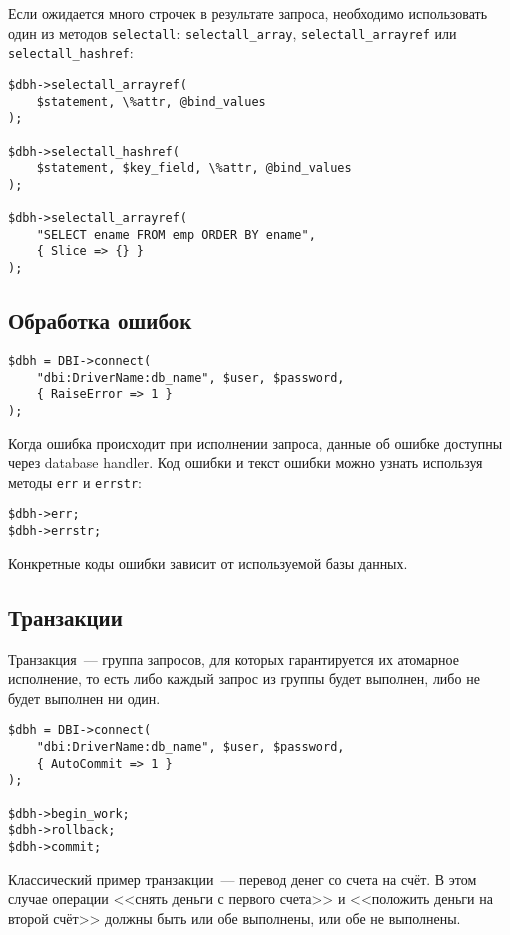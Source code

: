 Если ожидается много строчек в результате запроса, необходимо использовать один из методов
\verb|selectall|: \verb|selectall_array|, \verb|selectall_arrayref| или \verb|selectall_hashref|:
\begin{verbatim}
$dbh->selectall_arrayref(
    $statement, \%attr, @bind_values
);

$dbh->selectall_hashref(
    $statement, $key_field, \%attr, @bind_values
);

$dbh->selectall_arrayref(
    "SELECT ename FROM emp ORDER BY ename",
    { Slice => {} }
);
\end{verbatim}

\subsection{Обработка ошибок}

\begin{verbatim}
$dbh = DBI->connect(
    "dbi:DriverName:db_name", $user, $password,
    { RaiseError => 1 }
);
\end{verbatim}
Когда ошибка происходит при исполнении запроса, данные об ошибке доступны через database handler. Код ошибки и текст ошибки можно узнать используя методы \verb|err| и \verb|errstr|:
\begin{verbatim}
$dbh->err;
$dbh->errstr;
\end{verbatim}
Конкретные коды ошибки зависит от используемой базы данных.

\subsection{Транзакции}
Транзакция~--- группа запросов, для которых гарантируется их атомарное исполнение,
то есть либо каждый запрос из группы будет выполнен, либо не будет выполнен ни один.
\begin{verbatim}
$dbh = DBI->connect(
    "dbi:DriverName:db_name", $user, $password,
    { AutoCommit => 1 }
);

$dbh->begin_work;
$dbh->rollback;
$dbh->commit;
\end{verbatim}

Классический пример транзакции~--- перевод денег со счета на счёт.
В этом случае операции <<снять деньги с первого счета>> и <<положить деньги на второй счёт>> должны быть или обе выполнены, или обе не выполнены.


